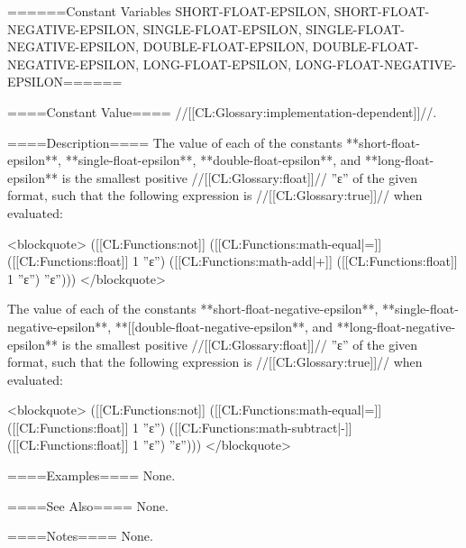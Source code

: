 ======Constant Variables SHORT-FLOAT-EPSILON, SHORT-FLOAT-NEGATIVE-EPSILON, SINGLE-FLOAT-EPSILON, SINGLE-FLOAT-NEGATIVE-EPSILON, DOUBLE-FLOAT-EPSILON, DOUBLE-FLOAT-NEGATIVE-EPSILON, LONG-FLOAT-EPSILON, LONG-FLOAT-NEGATIVE-EPSILON======

====Constant Value====
//[[CL:Glossary:implementation-dependent]]//.

====Description====
The value of each of the constants **short-float-epsilon**, **single-float-epsilon**, **double-float-epsilon**, and **long-float-epsilon** is the smallest positive //[[CL:Glossary:float]]// ''ε'' of the given format, such that the following expression is //[[CL:Glossary:true]]// when evaluated:

<blockquote>
([[CL:Functions:not]] ([[CL:Functions:math-equal|=]] ([[CL:Functions:float]] 1 ''ε'') ([[CL:Functions:math-add|+]] ([[CL:Functions:float]] 1 ''ε'') ''ε'')))
</blockquote>

The value of each of the constants **short-float-negative-epsilon**, **single-float-negative-epsilon**, **[[double-float-negative-epsilon**, and **long-float-negative-epsilon** is the smallest positive //[[CL:Glossary:float]]// ''ε'' of the given format, such that the following expression is //[[CL:Glossary:true]]// when evaluated:


<blockquote>
([[CL:Functions:not]] ([[CL:Functions:math-equal|=]] ([[CL:Functions:float]] 1 ''ε'') ([[CL:Functions:math-subtract|-]] ([[CL:Functions:float]] 1 ''ε'') ''ε'')))
</blockquote>

====Examples====
None.

====See Also====
None.

====Notes====
None.

